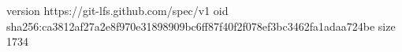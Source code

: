 version https://git-lfs.github.com/spec/v1
oid sha256:ca3812af27a2e8f970e31898909bc6ff87f40f2f078ef3bc3462fa1adaa724be
size 1734
